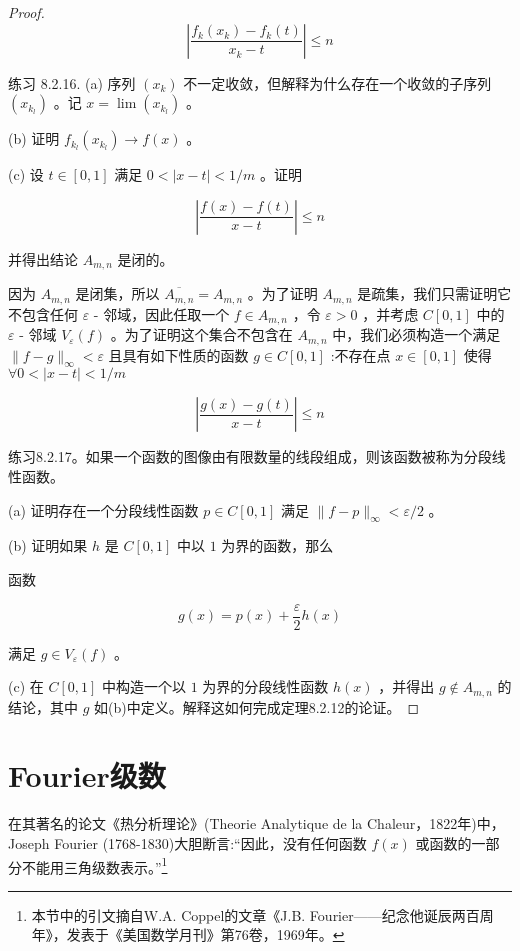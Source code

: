 \begin{proof}
\[
\left| \frac{{f}_{k}\left( {x}_{k}\right)  - {f}_{k}\left( t\right) }{{x}_{k} - t}\right|  \leq  n
\]

练习 8.2.16. (a) 序列 \(\left( {x}_{k}\right)\) 不一定收敛，但解释为什么存在一个收敛的子序列 \(\left( {x}_{{k}_{l}}\right)\) 。记 \(x = \lim \left( {x}_{{k}_{l}}\right)\) 。

(b) 证明 \({f}_{{k}_{l}}\left( {x}_{{k}_{l}}\right)  \rightarrow  f\left( x\right)\) 。

(c) 设 \(t \in  \left\lbrack  {0,1}\right\rbrack\) 满足 \(0 < \left| {x - t}\right|  < 1/m\) 。证明

\[
\left| \frac{f\left( x\right)  - f\left( t\right) }{x - t}\right|  \leq  n
\]

并得出结论 \({A}_{m,n}\) 是闭的。

因为 \({A}_{m,n}\) 是闭集，所以 \(\overline{{A}_{m,n}} = {A}_{m,n}\) 。为了证明 \({A}_{m,n}\) 是疏集，我们只需证明它不包含任何 \(\varepsilon\) - 邻域，因此任取一个 \(f \in  {A}_{m,n}\) ，令 \(\varepsilon  > 0\) ，并考虑 \(C\left\lbrack  {0,1}\right\rbrack\) 中的 \(\varepsilon\) - 邻域 \({V}_{\varepsilon }\left( f\right)\) 。为了证明这个集合不包含在 \({A}_{m,n}\) 中，我们必须构造一个满足 \(\parallel f - g{\parallel }_{\infty } < \varepsilon\) 且具有如下性质的函数 \(g \in  C\left\lbrack  {0,1}\right\rbrack\) :不存在点 \(x \in  \left\lbrack  {0,1}\right\rbrack\) 使得 $\forall 0 < \left| {x - t}\right|  < 1/m$

\[
\left| \frac{g\left( x\right)  - g\left( t\right) }{x - t}\right|  \leq  n
\]

练习8.2.17。如果一个函数的图像由有限数量的线段组成，则该函数被称为分段线性函数。

(a) 证明存在一个分段线性函数 \(p \in  C\left\lbrack  {0,1}\right\rbrack\) 满足 \(\parallel f - p{\parallel }_{\infty } < \varepsilon /2\) 。

(b) 证明如果 \(h\) 是 \(C\left\lbrack  {0,1}\right\rbrack\) 中以 $1$ 为界的函数，那么

函数

\[
g\left( x\right)  = p\left( x\right)  + \frac{\varepsilon }{2}h\left( x\right)
\]

满足 \(g \in  {V}_{\varepsilon }\left( f\right)\) 。

(c) 在 \(C\left\lbrack  {0,1}\right\rbrack\) 中构造一个以 $1$ 为界的分段线性函数 \(h\left( x\right)\) ，并得出 \(g \notin  {A}_{m,n}\) 的结论，其中 \(g\) 如(b)中定义。解释这如何完成定理8.2.12的论证。  
\end{proof}

\section{Fourier级数}
\label{sec:8.3}
在其著名的论文《热分析理论》(Theorie Analytique de la Chaleur，1822年)中，Joseph Fourier (1768-1830)大胆断言:“因此，没有任何函数 \(f\left( x\right)\) 或函数的一部分不能用三角级数表示。”\footnote{本节中的引文摘自W.A. Coppel的文章《J.B. Fourier——纪念他诞辰两百周年》，发表于《美国数学月刊》第76卷，1969年。}

